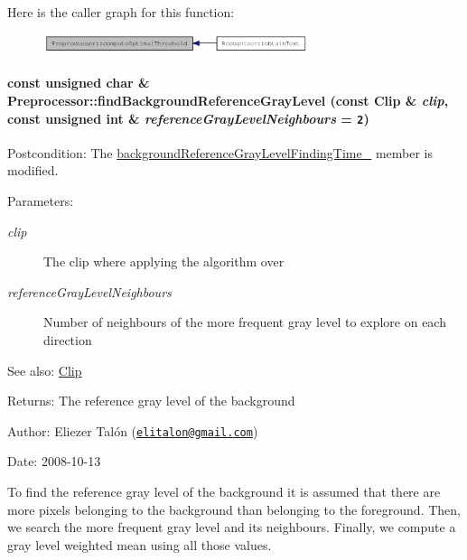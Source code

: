 Here is the caller graph for this function:\nopagebreak
\begin{figure}[H]
\begin{center}
\leavevmode
\includegraphics[width=220pt]{class_preprocessor_ac2f414d6f4f917419f33f6067eb8634_icgraph}
\end{center}
\end{figure}
\hypertarget{class_preprocessor_a941f81382bd8e235e4dd12481342be4}{
\paragraph[findBackgroundReferenceGrayLevel]{\setlength{\rightskip}{0pt plus 5cm}const unsigned char \& Preprocessor::findBackgroundReferenceGrayLevel (const {\bf Clip} \& {\em clip}, \/  const unsigned int \& {\em referenceGrayLevelNeighbours} = {\tt 2})}\hfill}
\label{class_preprocessor_a941f81382bd8e235e4dd12481342be4}


\begin{Desc}
\item[Postcondition:]The \hyperlink{class_preprocessor_98ea95388e043eef5460beaf2e3aaaed}{backgroundReferenceGrayLevelFindingTime\_\-} member is modified.\end{Desc}
\begin{Desc}
\item[Parameters:]
\begin{description}
\item[{\em clip}]The clip where applying the algorithm over \item[{\em referenceGrayLevelNeighbours}]Number of neighbours of the more frequent gray level to explore on each direction\end{description}
\end{Desc}
\begin{Desc}
\item[See also:]\hyperlink{class_clip}{Clip}\end{Desc}
\begin{Desc}
\item[Returns:]The reference gray level of the background\end{Desc}
\begin{Desc}
\item[Author:]Eliezer Talón (\href{mailto:elitalon@gmail.com}{\tt elitalon@gmail.com}) \end{Desc}
\begin{Desc}
\item[Date:]2008-10-13\end{Desc}
To find the reference gray level of the background it is assumed that there are more pixels belonging to the background than belonging to the foreground. Then, we search the more frequent gray level and its neighbours. Finally, we compute a gray level weighted mean using all those values.

